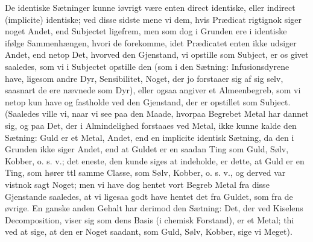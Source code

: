 \documentclass[12pt]{book}
\def\textit#1{#1}%
\newcommand{\opage}[1]{\marginnote{\footnotesize\textit{[#1]}}}
\begin{document}
De identiske Sætninger kunne iøvrigt være enten \textit{direct} identiske, eller
\textit{indirect (implicite)} identiske; ved disse sidste mene vi dem, hvis
Prædicat rigtignok siger noget Andet, end Subjectet ligefrem, men som dog i
Grunden ere i identiske ifølge Sammenhængen, hvori de forekomme, idet Prædicatet
enten ikke udsiger Andet, end netop Det, hvorved den Gjenstand, vi
\opage{303} opstille som Subject, er os givet saaledes, som vi i Subjectet opstille den (som
i den Sætning: Infusionsdyrene have, ligesom andre Dyr, Sensibilitet, Noget, der
jo forstaaer sig af sig selv, saasnart de ere nævnede som Dyr), eller ogsaa
angiver et Almeenbegreb, som vi netop kun have og fastholde ved den Gjenstand,
der er opstillet som Subject. (Saaledes ville vi, naar vi see paa den Maade,
hvorpaa Begrebet Metal har dannet sig, og paa Det, der i Almindelighed forstaaes
ved Metal, ikke kunne kalde den Sætning: Guld er et Metal, Andet, end en
implicite identisk Sætning, da den i Grunden ikke siger Andet, end at Guldet er
en saadan Ting som Guld, Sølv, Kobber, o. s. v.; det eneste, den kunde siges at
indeholde, er dette, at Guld er en Ting, som hører ttl samme Classe, som Sølv,
Kobber, o. s. v., og derved var vistnok sagt Noget; men vi have dog hentet vort
Begreb Metal fra disse Gjenstande saaledes, at vi ligesaa godt have hentet det
fra Guldet, som fra de øvrige. En ganske anden Gehalt har derimod den Sætning:
Det, der ved Kiselens Decomposition, viser sig som dens Basis (i chemisk
Forstand), er et Metal; thi ved at sige, at den er Noget saadant, som Guld, Sølv,
Kobber, sige vi Meget).
\end{document}
